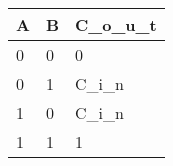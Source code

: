 \begin{tabular}{|l|l|l|} \hline
A & B & C_o_u_t  \\ \hline
0 & 0 & 0      \\
0 & 1 & C_i_n  \\
1 & 0 & C_i_n  \\
1 & 1 & 1      \\ \hline
\end{tabular}


